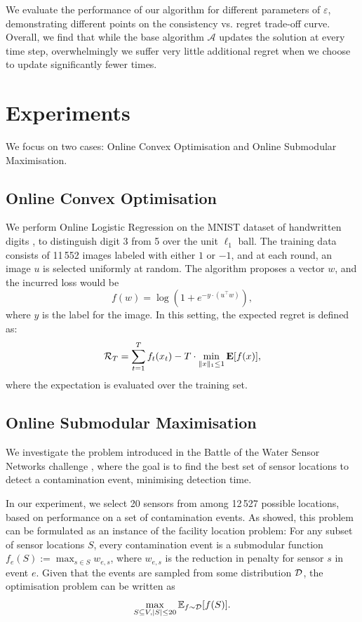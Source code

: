 We evaluate the performance of our algorithm for different parameters of $\varepsilon$, demonstrating different points on the consistency vs. regret trade-off curve. Overall, we find that while the base algorithm $\mathcal{A}$ updates the solution at every time step, overwhelmingly we suffer very little additional regret when we choose to update significantly fewer times. 

\section{Experiments}
We focus on two cases: Online Convex Optimisation and Online Submodular Maximisation.
\subsection*{Online Convex Optimisation} We perform Online Logistic Regression on the MNIST dataset of handwritten digits \citep{lecun1998mnist}, to distinguish digit 3 from 5 over the unit $\ell_1$ ball. The training data consists of 11\,552 images labeled with either $1$ or $-1$, and at each round, an image $u$ is selected uniformly at random. The algorithm proposes a vector $w$, and the incurred loss would be
\[
    f(w) = \log(1 + e^{-y\cdot(u^\top w)}),
\]
where $y$ is the label for the image. In this setting, the expected regret is defined as:
\[
    \mathcal{R}_T = \sum_{t=1}^T f_t(x_t) - T\cdot\min_{\|x\|_1 \leq 1} \mathbf{E}[f(x)],
\]
where the expectation is evaluated over the training set.

\subsection*{Online Submodular Maximisation}
We investigate the problem introduced in the Battle of the Water Sensor Networks challenge \citep{ostfeld08bwsn}, where the goal is to find the best set of sensor locations to detect a contamination event, minimising detection time.

In our experiment, we select 20 sensors from among 12\,527 possible locations, based on performance on a set of contamination events.  As \citet{leskovec07cost} showed, this problem can be formulated as an instance of the facility location problem: For any subset of sensor locations $S$, every contamination event is a submodular function $f_e(S) := \max_{s\in S} w_{e,s}$, where $w_{e,s}$ is the reduction in penalty for sensor $s$ in event $e$. Given that the events are sampled from some distribution $\mathcal{D}$, the optimisation problem can be written as
\[
    \max_{S\subseteq V, |S|\leq 20} \mathbb{E}_{f\sim \mathcal{D}}[f(S)].
\]


